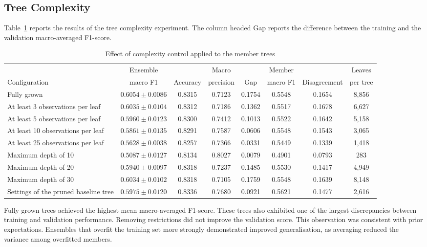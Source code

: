 \documentclass[conference]{IEEEtran}
\begin{document}
\subsection{Tree Complexity}

Table~\ref{tab:complexity} reports the results of the tree complexity experiment. The column headed Gap reports the difference between the training and the validation macro-averaged F1-score.

\begin{table}[!t]
\caption{Effect of complexity control applied to the member trees}
\label{tab:complexity}
\centering
\begin{tabular}{@{}lccccccc@{}}
\toprule
 & Ensemble & & Macro & & Member & & Leaves \\
Configuration & macro F1 & Accuracy & precision & Gap & macro F1 & Disagreement & per tree \\
\midrule
Fully grown & $0.6054\pm0.0086$ & 0.8315 & 0.7123 & 0.1754 & 0.5548 & 0.1654 & 8,856 \\
At least 3 observations per leaf & $0.6035\pm0.0104$ & 0.8312 & 0.7186 & 0.1362 & 0.5517 & 0.1678 & 6,627 \\
At least 5 observations per leaf & $0.5960\pm0.0123$ & 0.8300 & 0.7412 & 0.1013 & 0.5522 & 0.1642 & 5,158 \\
At least 10 observations per leaf & $0.5861\pm0.0135$ & 0.8291 & 0.7587 & 0.0606 & 0.5548 & 0.1543 & 3,065 \\
At least 25 observations per leaf & $0.5628\pm0.0038$ & 0.8257 & 0.7366 & 0.0331 & 0.5449 & 0.1339 & 1,418 \\
Maximum depth of 10 & $0.5087\pm0.0127$ & 0.8134 & 0.8027 & 0.0079 & 0.4901 & 0.0793 & 283 \\
Maximum depth of 20 & $0.5940\pm0.0097$ & 0.8318 & 0.7237 & 0.1485 & 0.5530 & 0.1417 & 4,949 \\
Maximum depth of 30 & $0.6034\pm0.0102$ & 0.8318 & 0.7105 & 0.1759 & 0.5548 & 0.1639 & 8,148 \\
Settings of the pruned baseline tree & $0.5975\pm0.0120$ & 0.8336 & 0.7680 & 0.0921 & 0.5621 & 0.1477 & 2,616 \\
\bottomrule
\end{tabular}
\end{table}

Fully grown trees achieved the highest mean macro-averaged F1-score. These trees also exhibited one of the largest discrepancies between training and validation performance. Removing restrictions did not improve the validation score. This observation was consistent with prior expectations. Ensembles that overfit the training set more strongly demonstrated improved generalisation, as averaging reduced the variance among overfitted members.
\end{document}
